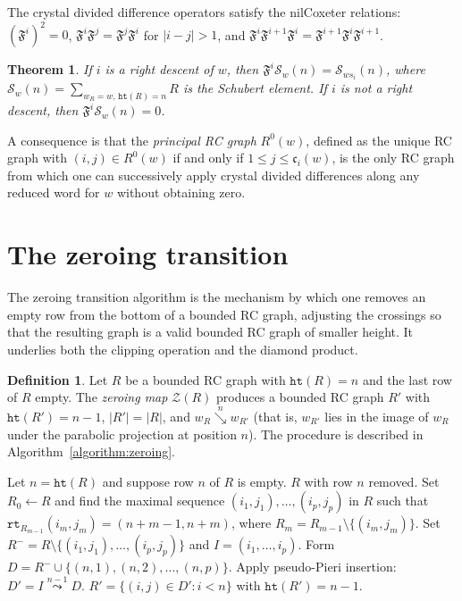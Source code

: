 \documentclass{amsart}
\newtheorem{theorem}{Theorem}[section]
\theoremstyle{definition}
\newtheorem{definition}[lemma]{Definition}
\theoremstyle{remark}
\numberwithin{equation}{section}
\newcommand{\wof}[1]{w_{#1}}
\newcommand{\hr}{\mathtt{ht}}
\newcommand{\zeromap}{\mathcal{Z}}
\newcommand{\rcdd}{\mathfrak{F}}
\newcommand{\downvar}[1]{\stackrel{#1}{\searrow}}
\newcommand{\code}{\mathfrak{c}}
\newcommand{\ins}[2]{{#2\overset{#1}{\leadsto}}}
\begin{document}
The crystal divided difference operators satisfy the nilCoxeter relations: $(\rcdd^i)^2 = 0$, $\rcdd^i \rcdd^j = \rcdd^j \rcdd^i$ for $|i - j| > 1$, and $\rcdd^i \rcdd^{i+1} \rcdd^i = \rcdd^{i+1} \rcdd^i \rcdd^{i+1}$.

\begin{theorem}\label{theorem:divdiff-schubert}
If $i$ is a right descent of $w$, then $\rcdd^i \mathcal{S}_w(n) = \mathcal{S}_{ws_i}(n)$, where $\mathcal{S}_w(n) = \sum_{\wof{R} = w,\, \hr(R) = n} R$ is the Schubert element.  If $i$ is not a right descent, then $\rcdd^i \mathcal{S}_w(n) = 0$.
\end{theorem}

A consequence is that the \textit{principal RC graph} $R^0(w)$, defined as the unique RC graph with $(i, j) \in R^0(w)$ if and only if $1 \leq j \leq \code_i(w)$, is the only RC graph from which one can successively apply crystal divided differences along any reduced word for $w$ without obtaining zero.




\section{The zeroing transition}\label{section:zeroing}

The zeroing transition algorithm is the mechanism by which one removes an empty row from the bottom of a bounded RC graph, adjusting the crossings so that the resulting graph is a valid bounded RC graph of smaller height.  It underlies both the clipping operation and the diamond product.

\begin{definition}\label{definition:zeroing}
Let $R$ be a bounded RC graph with $\hr(R) = n$ and the last row of $R$ empty.  The \textit{zeroing map} $\zeromap(R)$ produces a bounded RC graph $R'$ with $\hr(R') = n - 1$, $|R'| = |R|$, and $\wof{R} \downvar{n} \wof{R'}$ (that is, $\wof{R'}$ lies in the image of $\wof{R}$ under the parabolic projection at position $n$).  The procedure is described in Algorithm~\ref{algorithm:zeroing}.
\end{definition}

\begin{algorithm}
\caption{The zeroing map $\zeromap(R)$}
\label{algorithm:zeroing}
\begin{algorithmic}[1]
\State Let $n = \hr(R)$ and suppose row $n$ of $R$ is empty.
  \State \Return $R$ with row $n$ removed.
\Else
  \State Set $R_0 \gets R$ and find the maximal sequence $(i_1, j_1), \ldots, (i_p, j_p)$ in $R$ such that $\mathtt{rt}_{R_{m-1}}(i_m, j_m) = (n + m - 1, n + m)$, where $R_m = R_{m-1} \setminus \{(i_m, j_m)\}$.
  \State Set $R^- = R \setminus \{(i_1, j_1), \ldots, (i_p, j_p)\}$ and $I = (i_1, \ldots, i_p)$.
  \State Form $D = R^- \cup \{(n, 1), (n, 2), \ldots, (n, p)\}$.
  \State Apply pseudo-Pieri insertion: $D' = \ins{n-1}{I} D$.
  \State \Return $R' = \{(i, j) \in D' : i < n\}$ with $\hr(R') = n - 1$.
\EndIf
\end{algorithmic}
\end{algorithm}
\end{document}

